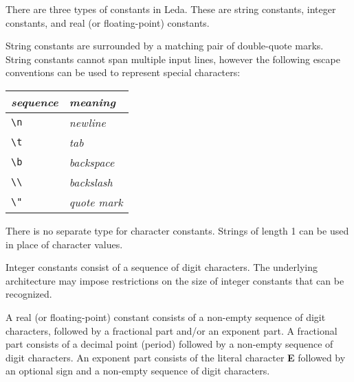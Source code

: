 There are three types of constants in Leda.  These are string constants,
integer constants, and real (or floating-point) constants.

String constants are surrounded by a matching pair of double-quote
marks.  String constants cannot span multiple input lines, however
the following escape conventions can be used to represent special
characters:

\begin{center}
\begin{tabular}{| l | l |}
\hline
{\em sequence} & {\em meaning} \\
\hline
\verb+\n+ & {\em newline} \\
\verb+\t+ & {\em tab} \\
\verb+\b+ & {\em backspace} \\
\verb+\\+ & {\em backslash} \\
\verb+\"+ & {\em quote mark} \\
\hline
\end{tabular}
\end{center}

There is no separate type for character constants.
Strings of length 1 can be used in place of character values.

Integer constants consist of a sequence of digit characters.
The underlying architecture may impose restrictions on the size
of integer constants that can be recognized.

A real (or floating-point) constant consists of a non-empty sequence
of digit characters, followed by a fractional part and/or an
exponent part.  A fractional part consists of a decimal point
(period) followed by a non-empty sequence of digit characters.
An exponent part consists of the literal character {\bf E} followed
by an optional sign and a non-empty sequence of digit characters.
